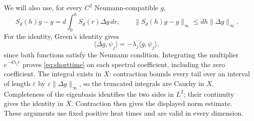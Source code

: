 \documentclass[11pt,a4paper]{article}
\begin{document}
We will also use, for every \(C^2\) Neumann-compatible \(g\),
\begin{equation}\label{eq:shorttime}
 S_d(h)g-g=d\int_0^h S_d(r)\Delta g\,dr,\qquad
 \|S_d(h)g-g\|_\infty\le dh\|\Delta g\|_\infty .
\end{equation}
For the identity, Green's identity gives
\[
 \langle\Delta g,\psi_j\rangle=-\lambda_j\langle g,\psi_j\rangle,
\]
since both functions satisfy the Neumann condition. Integrating the
multiplier \(e^{-d\lambda_jr}\) proves \eqref{eq:shorttime} on each
spectral coefficient, including the zero coefficient. The integral
exists in \(X\): contraction bounds every tail over an interval of
length \(\varepsilon\) by \(\varepsilon\|\Delta g\|_\infty\), so the
truncated integrals are Cauchy in \(X\). Completeness of the eigenbasis
identifies the two sides in \(L^2\); their continuity gives the identity
in \(X\). Contraction then gives the displayed norm estimate.
These arguments use fixed positive heat times and are valid in every dimension.
\end{document}
